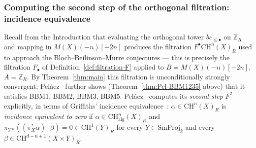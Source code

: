 \documentclass[12pt,a4paper]{article}
\theoremstyle{definition}
\newcommand{\CH}{\mathrm{CH}}
\newcommand{\Z}{\mathbb{Z}}
\newcommand{\SmProj}{\mathrm{SmProj}}
\newcommand{\alg}{\mathrm{alg}}
\begin{document}
\subsubsection{Computing the second step of the orthogonal filtration:
incidence equivalence}

Recall from the Introduction that evaluating the orthogonal tower
$bc_{\leq\bullet}$ on $\Z_R$ and mapping in $M(X)(-n)[-2n]$ produces the
filtration $F^\bullet\CH^n(X)_R$ used to approach the Bloch--Beilinson--Murre
conjectures — this is precisely the filtration $F_\bullet$ of
Definition~\ref{def:filtration-F} applied to $B=M(X)(-n)[-2n]$, $A=\Z_R$.  By
Theorem~\ref{thm:main} this filtration is unconditionally strongly convergent;
Peláez~\cite{Pel17} further shows (Theorem~\ref{thm:Pel-BBM1235} above) that it
satisfies BBM1, BBM2, BBM3, BBM5.  Peláez~\cite{PelRey25} computes its
\emph{second step} $F^2$ explicitly, in terms of Griffiths' incidence
equivalence~\cite{Gri71}: $\alpha\in\CH^n(X)_R$ is \emph{incidence equivalent
to zero} if $\alpha\in\CH^n_{\alg}(X)_R$ and
$\pi_{Y\ast}((\pi_X^\ast\alpha)\cdot\beta)=0\in\CH^1(Y)_R$ for every
$Y\in\SmProj_k$ and every $\beta\in\CH^{d-n+1}(X\times Y)_R$.
\end{document}
